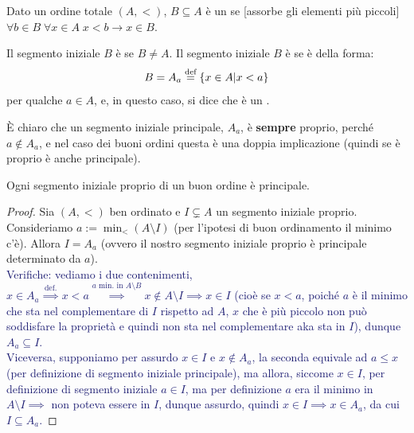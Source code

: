 \begin{definition}
	Dato un ordine totale $(A,<)$, $B \subseteq A$ è un  se [assorbe gli elementi più piccoli] $\forall b \in B \; \forall x \in A \; x < b \rightarrow x \in B$.
\end{definition}

\begin{definition}
	Il segmento iniziale $B$ è  se $B \ne A$. Il segmento iniziale $B$ è  se è della forma:
	\[ B = A_a \overset{\text{def}}{=} \{x \in A | x < a\}
		\]
	per qualche $a \in A$, e, in questo caso, si dice  che è un .
\end{definition}

È chiaro che un segmento iniziale principale, $A_a$, è \textbf{sempre} proprio, perché $a \not \in A_a$, e nel caso dei buoni ordini questa è una doppia implicazione (quindi se è proprio è 
anche principale).

\begin{proposition}
	Ogni segmento iniziale proprio di un buon ordine è principale.
\end{proposition}

\begin{proof}
	Sia $(A,<)$ ben ordinato e $I \subsetneq A$ un segmento iniziale proprio. Consideriamo $a := \min_<(A \setminus I)$ (per l'ipotesi di buon ordinamento il minimo c'è). Allora $I = A_a$ (ovvero 
	il nostro segmento iniziale proprio è principale determinato da $a$).\\
	\textcolor{MidnightBlue}{Verifiche: vediamo i due contenimenti, $x \in A_a \overset{\text{def.}}{\implies} x < a \overset{\text{$a$ min. in $A\setminus B$}}{\implies} x \not \in A \setminus I \implies x \in I$
	(cioè se $x < a$, poiché $a$ è il minimo che sta nel complementare di $I$ rispetto ad $A$, $x$ che è più piccolo non può soddisfare la proprietà e quindi non sta nel complementare aka sta in $I$), dunque $A_a \subseteq I$.\\
	Viceversa, supponiamo per assurdo $x \in I$ e $x \not \in A_a$, la seconda equivale ad $a \leq x$ (per definizione di segmento iniziale 
	principale), ma allora, siccome $x \in I$, per definizione di segmento iniziale $a \in I$, ma per definizione $a$ era il minimo in $A \setminus I \implies$ non poteva essere in $I$, dunque assurdo, quindi $x \in I \implies x \in A_a$, da cui $I \subseteq A_a$.}
\end{proof}

